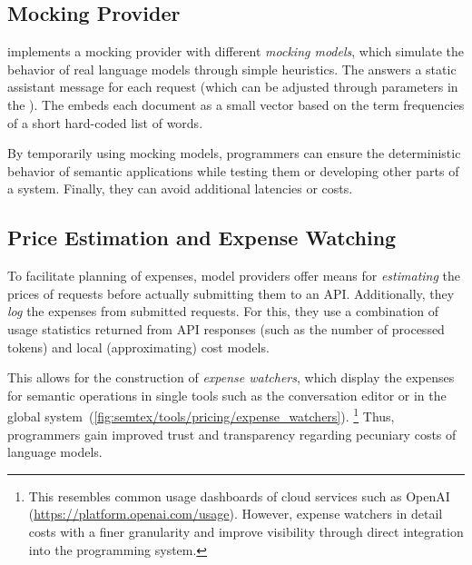 \subsection*{Mocking Provider}
\label{sec:semtex/tools/mocking}

\semtex implements a mocking provider with different \emph{mocking models}, which simulate the behavior of real language models through simple heuristics.
The  answers a static assistant message for each request (which can be adjusted through parameters in the ).
The  embeds each document as a small vector based on the term frequencies of a short hard-coded list of words.

By temporarily using mocking models, programmers can ensure the deterministic behavior of semantic applications while testing them or developing other parts of a system.
Finally, they can avoid additional latencies or costs.

\subsection*{Price Estimation and Expense Watching}
\label{sec:semtex/tools/pricing}

To facilitate planning of expenses, model providers offer means for \emph{estimating} the prices of requests before actually submitting them to an API.
Additionally, they \emph{log} the expenses from submitted requests.
For this, they use a combination of usage statistics returned from API responses (such as the number of processed tokens) and local (approximating) cost models.

This allows for the construction of \emph{expense watchers}, which display the expenses for semantic operations in single tools such as the conversation editor or in the global system~(\cref{fig:semtex/tools/pricing/expense_watchers}).%
\footnote{
	This resembles common usage dashboards of cloud services such as OpenAI (\url{https://platform.openai.com/usage}).
	However, expense watchers in \semtex detail costs with a finer granularity and improve visibility through direct integration into the programming system.
}
Thus, programmers gain improved trust and transparency regarding pecuniary costs of language models.

